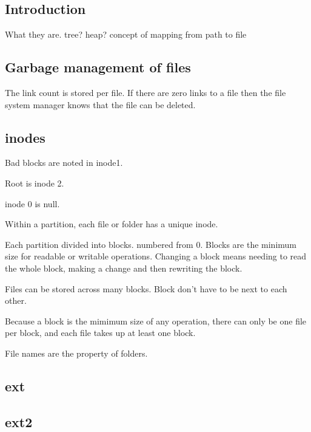 
\subsection{Introduction}

What they are. tree? heap? concept of mapping from path to file

\subsection{Garbage management of files}

The link count is stored per file. If there are zero links to a file then the file system manager knows that the file can be deleted.

\subsection{inodes}

Bad blocks are noted in inode1.

Root is inode 2.

inode 0 is null.


Within a partition, each file or folder has a unique inode.

Each partition divided into blocks. numbered from 0. Blocks are the minimum size for readable or writable operations. Changing a block means needing to read the whole block, making a change and then rewriting the block.

Files can be stored across many blocks. Block don't have to be next to each other.

Because a block is the mimimum size of any operation, there can only be one file per block, and each file takes up at least one block.

File names are the property of folders.


\subsection{ext}

\subsection{ext2}

